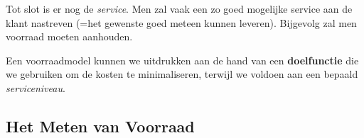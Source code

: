Tot slot is er nog de \textit{service}. Men zal vaak een zo goed mogelijke service aan de klant nastreven (=het gewenste goed meteen kunnen leveren). Bijgevolg zal men voorraad moeten aanhouden.

Een voorraadmodel kunnen we uitdrukken aan de hand van een \textbf{doelfunctie} die we gebruiken om de kosten te minimaliseren, terwijl we voldoen aan een bepaald \textit{serviceniveau}.


\subsection{Het Meten van Voorraad}
